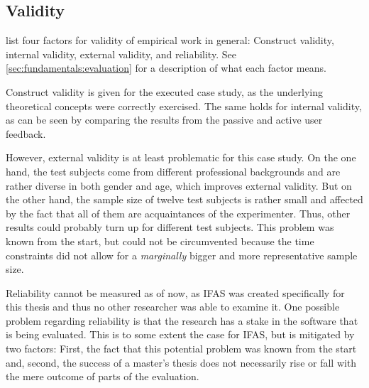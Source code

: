 

\FloatBarrier

\subsection{Validity}
\label{subec:evaluation:user:validity}

\citet{Easterbrook2008a} list four factors for validity of empirical work in general: Construct validity, internal validity, external validity, and reliability.
See \cref{sec:fundamentals:evaluation} for a description of what each factor means.

Construct validity is given for the executed case study, as the underlying theoretical concepts were correctly exercised.
The same holds for internal validity, as can be seen by comparing the results from the passive and active user feedback.

However, external validity is at least problematic for this case study.
On the one hand, the test subjects come from different professional backgrounds and are rather diverse in both gender and age, which improves external validity.
But on the other hand, the sample size of twelve test subjects is rather small and affected by the fact that all of them are acquaintances of the experimenter.
Thus, other results could probably turn up for different test subjects.
This problem was known from the start, but could not be circumvented because the time constraints did not allow for a \emph{marginally} bigger and more representative sample size.

Reliability cannot be measured as of now, as \ac{IFAS} was created specifically for this thesis and thus no other researcher was able to examine it.
One possible problem regarding reliability is that the research has a stake in the software that is being evaluated.
This is to some extent the case for \ac{IFAS}, but is mitigated by two factors:
First, the fact that this potential problem was known from the start and, second, the success of a master's thesis does not necessarily rise or fall with the mere outcome of parts of the evaluation.

